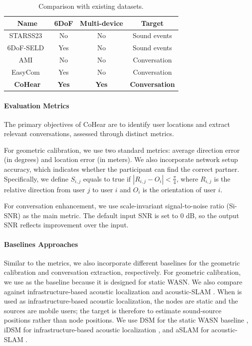 \begin{table}[t]
\caption{Comparison with existing datasets.}
\centering
\begin{tabular}{|c|c|c|c|}
\hline
\textbf{Name} & \textbf{6DoF} & \textbf{Multi-device} & \textbf{Target} \\
\hline
STARSS23~\cite{shimada2024starss23} & No & No & Sound events \\
6DoF-SELD~\cite{yasuda20246dof} & Yes & No & Sound events \\
AMI~\cite{kraaij2005ami} & No & No & Conversation \\
EasyCom~\cite{donley2021easycom} & Yes & No & Conversation \\
\textbf{CoHear} & \textbf{Yes} & \textbf{Yes} & \textbf{Conversation} \\
\hline
\end{tabular}
\label{tab:comparison_dataset}
\end{table}



\paragraph{Evaluation Metrics}
The primary objectives of CoHear are to identify user locations and extract relevant conversations, assessed through distinct metrics.

For geometric calibration, we use two standard metrics: average direction error (in degrees) and location error (in meters). We also incorporate network setup accuracy, which indicates whether the participant can find the correct partner. Specifically, we define \(S_{i,j}\) equals to true if \(|R_{i,j} - O_i| < \frac{\pi}{4}\), where \(R_{i,j}\) is the relative direction from user \(j\) to user \(i\) and \(O_i\) is the orientation of user \(i\). 

For conversation enhancement, we use scale-invariant signal-to-noise ratio (Si-SNR) as the main metric. The default input SNR is set to 0 dB, so the output SNR reflects improvement over the input.

\paragraph{Baselines Approaches}
Similar to the metrics, we also incorporate different baselines for the geometric calibration and conversation extraction, respectively.
For geometric calibration, we use \cite{gburrek2021geometry} as the baseline because it is designed for static WASN. We also compare against infrastructure-based acoustic localization \cite{gburrek2021geometry} and acoustic-SLAM \cite{evers2018acoustic}. When \cite{gburrek2021geometry} is used as infrastructure-based acoustic localization, the nodes are static and the sources are mobile users; the target is therefore to estimate sound-source positions rather than node positions. We use DSM for the static WASN baseline \cite{gburrek2021geometry}, iDSM for infrastructure-based acoustic localization \cite{gburrek2021geometry}, and aSLAM for acoustic-SLAM \cite{evers2018acoustic}.


